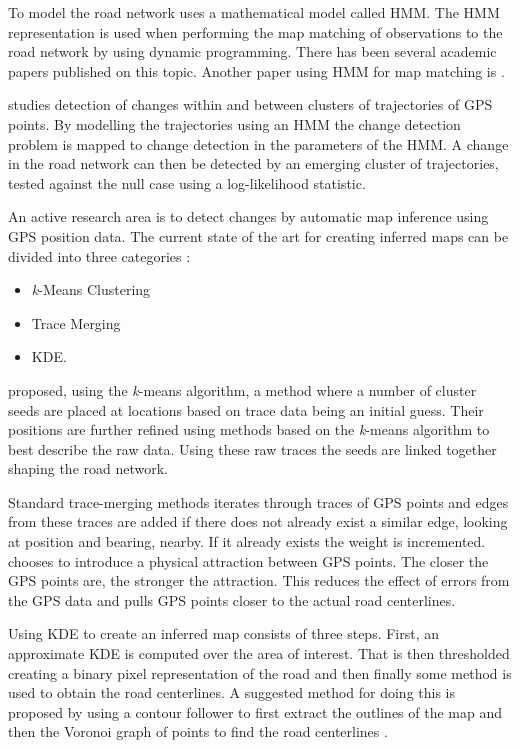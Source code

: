 To model the road network \cite{biagioni:gis12} uses a mathematical model called \ac{HMM}. The \ac{HMM} representation is used when performing the map matching of observations to the road network by using dynamic programming. There has been several academic papers published on this topic. Another paper using \ac{HMM} for map matching is \citep{newson:hmm}.

\cite{kondaveeti:clusters} studies detection of changes within and between clusters of trajectories of \ac{GPS} points. By modelling the trajectories using an \ac{HMM} the change detection problem is mapped to change detection in the parameters of the \ac{HMM}. A change in the road network can then be detected by an emerging cluster of trajectories, tested against the null case using a log-likelihood statistic. 

An active research area is to detect changes by automatic map inference using \ac{GPS} position data. The current state of the art for creating inferred maps can be divided into three categories \citep{4inBiagioni}:
\begin{itemize}
    \item \textit{k}-Means Clustering
    \item Trace Merging
    \item \ac{KDE}.
\end{itemize}

\cite{edelkamp} proposed, using the \textit{k}-means algorithm, a method where a number of cluster seeds are placed at locations based on trace data being an initial guess. Their positions are further refined using methods based on the \textit{k}-means algorithm to best describe the raw data. Using these raw traces the seeds are linked together shaping the road network. 

Standard trace-merging methods iterates through traces of \ac{GPS} points and edges from these traces are added if there does not already exist a similar edge, looking at position and bearing, nearby. If it already exists the weight is incremented. \cite{cao} chooses to introduce a physical attraction between \ac{GPS} points. The closer the \ac{GPS} points are, the stronger the attraction. This reduces the effect of errors from the \ac{GPS} data and pulls \ac{GPS} points closer to the actual road centerlines. 

Using \ac{KDE} to create an inferred map consists of three steps. First, an approximate \ac{KDE} is computed over the area of interest. That is then thresholded creating a binary pixel representation of the road and then finally some method is used to obtain the road centerlines. A suggested method for doing this is proposed by \cite{davies} using a contour follower to first extract the outlines of the map \citep{kde24} and then the Voronoi graph of points to find the road centerlines \citep{kde25}. 

